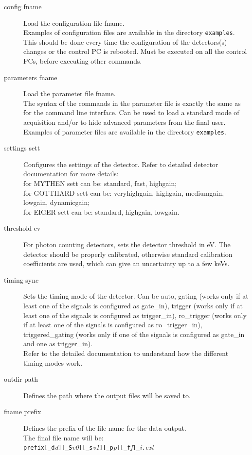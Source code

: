 \documentclass{article}
\newcommand{\E}{EIGER\xspace}
\begin{document}
\begin{description}
\item[config fname] 
Load the configuration file fname. \\
Examples of configuration files are available in the directory \verb=examples=. This should be done every time the configuration of the detectors(s) changes or the control PC is rebooted. Must be executed on all the control PCs, before executing other commands.
\item[parameters fname] 
Load the parameter file fname. \\
The syntax of the commands in the parameter file is exactly the same as for the command line interface. Can be used to load a standard mode of acquisition and/or to hide advanced parameters from the final user. Examples of parameter files are available in the directory \verb=examples=.     
\item[settings sett] 
Configures the settings of the detector. Refer to detailed detector documentation for more details:   \\
for MYTHEN sett can be: standard, fast, highgain;\\
for GOTTHARD sett can be: veryhighgain, highgain, mediumgain, lowgain, dynamicgain;\\
for \E sett can be: standard, highgain, lowgain.
\item[threshold ev] 
For photon counting detectors, sets the detector threshold in eV. The detector should be properly calibrated, otherwise standard calibration coefficients are used, which can give an uncertainty up to a few keVs.  
\item[timing sync]   
Sets the timing mode of the detector. Can be auto, gating (works only if at least one of the signals is configured as gate\_in), trigger (works only if at least one of the signals is configured as trigger\_in), ro\_trigger (works only if at least one of the signals is configured as ro\_trigger\_in), triggered\_gating (works only if one of the signals is configured as gate\_in and one as trigger\_in). \\
Refer to the detailed documentation to understand how the different timing modes work.
\item[outdir path] 
Defines the path where the output files will be saved to.
\item[fname prefix]
Defines the prefix of the file name for the data output. \\
The final file name will be: \\
\verb=prefix[_d=\textit{d}\verb=][_S=\textit{v0}\verb=][_s=\textit{v1}\verb=][_p=\textit{p}\verb=][_f=\textit{f}\verb=]_=\textit{i}\verb=.=\textit{ext}\\

\end{description}
\end{document}
